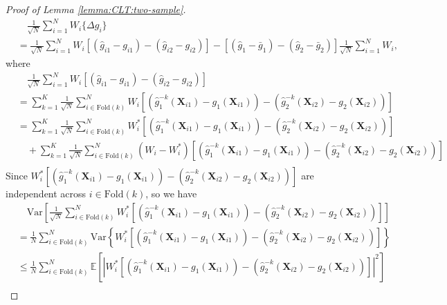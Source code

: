 \documentclass[12pt,letterpaper]{article}
\begin{document}
\begin{proof}[Proof of Lemma \ref{lemma:CLT:two-sample}]
\begin{equation}
\begin{array}{rl}
&\displaystyle\quad\frac{1}{\sqrt{N}}\sum_{i=1}^NW_i\{\Delta g_i\}\\
&\displaystyle=\frac{1}{\sqrt{N}}\sum_{i=1}^NW_i[(\hat{g}_{i1}-g_{i1})-(\hat{g}_{i2}-g_{i2})]-[(\hat{g}_1-\bar{g}_1)-(\hat{g}_2-\bar{g}_2)]\frac{1}{\sqrt{N}}\sum_{i=1}^NW_i,
\end{array}
\end{equation}
where 
\begin{equation}\label{eq:W:g:decompose}
\begin{array}{rl}
&\displaystyle\quad\frac{1}{\sqrt{N}}\sum_{i=1}^NW_i[(\hat{g}_{i1}-g_{i1})-(\hat{g}_{i2}-g_{i2})]\\
&\displaystyle=\sum_{k=1}^K\frac{1}{\sqrt{N}}\sum_{i\in\textrm{Fold}(k)}^NW_i[(\hat{g}_{1}^{-k}(\mathbf{X}_{i1})-g_{1}(\mathbf{X}_{i1}))-(\hat{g}_{2}^{-k}(\mathbf{X}_{i2})-g_{2}(\mathbf{X}_{i2}))]\\
&\displaystyle=\sum_{k=1}^K\frac{1}{\sqrt{N}}\sum_{i\in\textrm{Fold}(k)}^NW_i^*[(\hat{g}_{1}^{-k}(\mathbf{X}_{i1})-g_{1}(\mathbf{X}_{i1}))-(\hat{g}_{2}^{-k}(\mathbf{X}_{i2})-g_{2}(\mathbf{X}_{i2}))]\\
&\displaystyle\quad+\sum_{k=1}^K\frac{1}{\sqrt{N}}\sum_{i\in\textrm{Fold}(k)}^N(W_i-W_i^*)[(\hat{g}_{1}^{-k}(\mathbf{X}_{i1})-g_{1}(\mathbf{X}_{i1}))-(\hat{g}_{2}^{-k}(\mathbf{X}_{i2})-g_{2}(\mathbf{X}_{i2}))]\\
\end{array}
\end{equation}
Since $W_i^*\left[(\hat{g}_{1}^{-k}(\mathbf{X}_{i1})-g_{1}(\mathbf{X}_{i1}))-(\hat{g}_{2}^{-k}(\mathbf{X}_{i2})-g_{2}(\mathbf{X}_{i2}))\right]$ are independent across $i\in\textrm{Fold}(k)$, so we have 
\begin{equation}\label{eq:W:g:1}
\begin{array}{rl}
&\displaystyle\quad\mathrm{Var}\left[\frac{1}{\sqrt{N}}\sum_{i\in\textrm{Fold}(k)}^NW_i^*\left[(\hat{g}_{1}^{-k}(\mathbf{X}_{i1})-g_{1}(\mathbf{X}_{i1}))-(\hat{g}_{2}^{-k}(\mathbf{X}_{i2})-g_{2}(\mathbf{X}_{i2}))\right]\right]\\
&\displaystyle=\frac{1}{N}\sum_{i\in\textrm{Fold}(k)}^N\mathrm{Var}\left\{W_i^*\left[(\hat{g}_{1}^{-k}(\mathbf{X}_{i1})-g_{1}(\mathbf{X}_{i1}))-(\hat{g}_{2}^{-k}(\mathbf{X}_{i2})-g_{2}(\mathbf{X}_{i2}))\right]\right\}\\
&\displaystyle\leq\frac{1}{N}\sum_{i\in\textrm{Fold}(k)}^N\mathbb{E}\left[\left|W_i^*\left[(\hat{g}_{1}^{-k}(\mathbf{X}_{i1})-g_{1}(\mathbf{X}_{i1}))-(\hat{g}_{2}^{-k}(\mathbf{X}_{i2})-g_{2}(\mathbf{X}_{i2}))\right]\right|^2\right]\\

\end{array}
\end{equation}
\end{proof}
\end{document}
